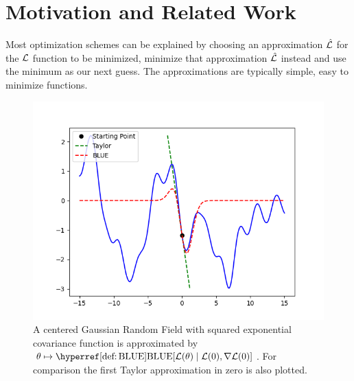 \section{Motivation and Related Work}

Most optimization schemes can be explained by choosing an approximation 
\(\hat{\mathcal{L}}\) for the \(\mathcal{L}\) function to be minimized, minimize that
approximation \(\hat{\mathcal{L}}\) instead and use the minimum as our next guess.
The approximations are typically simple, easy to minimize functions.

\begin{figure}
	\includegraphics[scale=0.7]{graphics/BLUEvsTaylor3.png}
	\caption{
		A centered Gaussian Random Field with squared exponential covariance
		function is approximated by \(\param \mapsto \BLUE[\Loss(\param)\mid
		\Loss(0),\grad\Loss(0)]\). For comparison the first Taylor
		approximation in zero is also plotted. 
	}
\end{figure}

